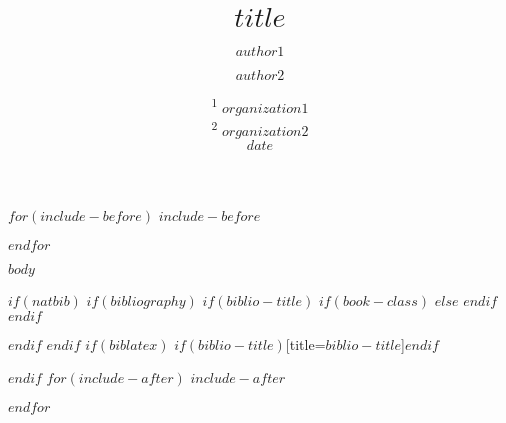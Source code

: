 \documentclass[$if(fontsize)$$fontsize$,$endif$$if(lang)$$babel-lang$,$endif$$if(papersize)$$papersize$paper,$endif$$for(classoption)$$classoption$$sep$,$endfor$]{$documentclass$}
\title{$title$}
\author{$author1$ \and $author2$}
\date{%
		\textsuperscript{1} $organization1$\\%
		\textsuperscript{2} $organization2$\\[2ex]
		$date$
   }
\begin{document}
$for(include-before)$
$include-before$

$endfor$

$body$

$if(natbib)$
$if(bibliography)$
$if(biblio-title)$
$if(book-class)$
\renewcommand\bibname{$biblio-title$}
$else$
\renewcommand\refname{$biblio-title$}
$endif$
$endif$


$endif$
$endif$
$if(biblatex)$
\printbibliography$if(biblio-title)$[title=$biblio-title$]$endif$

$endif$
$for(include-after)$
$include-after$

$endfor$
\end{document}
